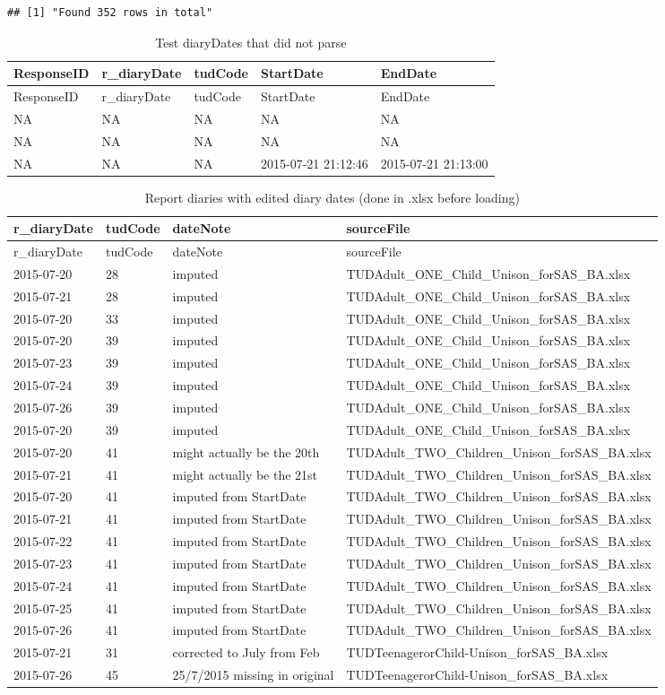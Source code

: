 \documentclass[]{article}
\begin{document}
\begin{verbatim}
## [1] "Found 352 rows in total"
\end{verbatim}

\begin{longtable}[]{@{}lllll@{}}
\caption{Test diaryDates that did not parse}\tabularnewline
\toprule
ResponseID & r\_diaryDate & tudCode & StartDate & EndDate\tabularnewline
\midrule
\endfirsthead
\toprule
ResponseID & r\_diaryDate & tudCode & StartDate & EndDate\tabularnewline
\midrule
\endhead
NA & NA & NA & NA & NA\tabularnewline
NA & NA & NA & NA & NA\tabularnewline
NA & NA & NA & 2015-07-21 21:12:46 & 2015-07-21 21:13:00\tabularnewline
\bottomrule
\end{longtable}

\begin{longtable}[]{@{}llll@{}}
\caption{Report diaries with edited diary dates (done in .xlsx before
loading)}\tabularnewline
\toprule
r\_diaryDate & tudCode & dateNote & sourceFile\tabularnewline
\midrule
\endfirsthead
\toprule
r\_diaryDate & tudCode & dateNote & sourceFile\tabularnewline
\midrule
\endhead
2015-07-20 & 28 & imputed &
TUDAdult\_ONE\_Child\_Unison\_forSAS\_BA.xlsx\tabularnewline
2015-07-21 & 28 & imputed &
TUDAdult\_ONE\_Child\_Unison\_forSAS\_BA.xlsx\tabularnewline
2015-07-20 & 33 & imputed &
TUDAdult\_ONE\_Child\_Unison\_forSAS\_BA.xlsx\tabularnewline
2015-07-20 & 39 & imputed &
TUDAdult\_ONE\_Child\_Unison\_forSAS\_BA.xlsx\tabularnewline
2015-07-23 & 39 & imputed &
TUDAdult\_ONE\_Child\_Unison\_forSAS\_BA.xlsx\tabularnewline
2015-07-24 & 39 & imputed &
TUDAdult\_ONE\_Child\_Unison\_forSAS\_BA.xlsx\tabularnewline
2015-07-26 & 39 & imputed &
TUDAdult\_ONE\_Child\_Unison\_forSAS\_BA.xlsx\tabularnewline
2015-07-20 & 39 & imputed &
TUDAdult\_ONE\_Child\_Unison\_forSAS\_BA.xlsx\tabularnewline
2015-07-20 & 41 & might actually be the 20th &
TUDAdult\_TWO\_Children\_Unison\_forSAS\_BA.xlsx\tabularnewline
2015-07-21 & 41 & might actually be the 21st &
TUDAdult\_TWO\_Children\_Unison\_forSAS\_BA.xlsx\tabularnewline
2015-07-20 & 41 & imputed from StartDate &
TUDAdult\_TWO\_Children\_Unison\_forSAS\_BA.xlsx\tabularnewline
2015-07-21 & 41 & imputed from StartDate &
TUDAdult\_TWO\_Children\_Unison\_forSAS\_BA.xlsx\tabularnewline
2015-07-22 & 41 & imputed from StartDate &
TUDAdult\_TWO\_Children\_Unison\_forSAS\_BA.xlsx\tabularnewline
2015-07-23 & 41 & imputed from StartDate &
TUDAdult\_TWO\_Children\_Unison\_forSAS\_BA.xlsx\tabularnewline
2015-07-24 & 41 & imputed from StartDate &
TUDAdult\_TWO\_Children\_Unison\_forSAS\_BA.xlsx\tabularnewline
2015-07-25 & 41 & imputed from StartDate &
TUDAdult\_TWO\_Children\_Unison\_forSAS\_BA.xlsx\tabularnewline
2015-07-26 & 41 & imputed from StartDate &
TUDAdult\_TWO\_Children\_Unison\_forSAS\_BA.xlsx\tabularnewline
2015-07-21 & 31 & corrected to July from Feb &
TUDTeenagerorChild-Unison\_forSAS\_BA.xlsx\tabularnewline
2015-07-26 & 45 & 25/7/2015 missing in original &
TUDTeenagerorChild-Unison\_forSAS\_BA.xlsx\tabularnewline
\bottomrule
\end{longtable}
\end{document}
